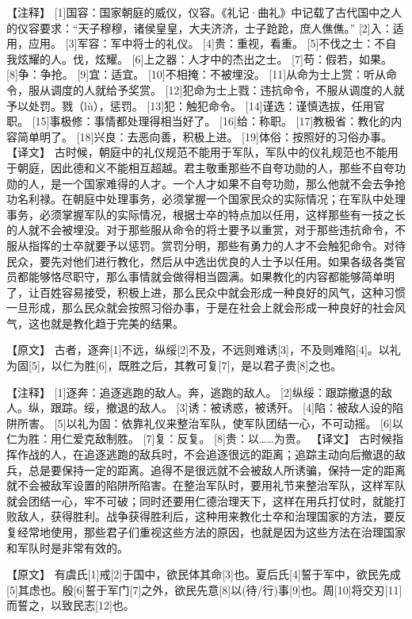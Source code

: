 \documentclass[a4paper,12pt,UTF8,twoside]{ctexbook}
\begin{document}
【注释】
[1]国容：国家朝庭的威仪，仪容。《礼记·曲礼》中记载了古代国中之人的仪容要求：“天子穆穆，诸侯皇皇，大夫济济，士子跄跄，庶人僬僬。”
[2]入：适用，应用。
[3]军容：军中将士的礼仪。
[4]贵：重视，看重。
[5]不伐之士：不自我炫耀的人。伐，炫耀。
[6]上之器：人才中的杰出之士。
[7]苟：假若，如果。
[8]争：争抢。
[9]宜：适宜。
[10]不相掩：不被埋没。
[11]从命为士上赏：听从命令，服从调度的人就给予奖赏。
[12]犯命为士上戮：违抗命令，不服从调度的人就予以处罚。戮（lù），惩罚。
[13]犯：触犯命令。
[14]谨选：谨慎选拔，任用官职。
[15]事极修：事情都处理得相当好了。
[16]给：称职。
[17]教极省：教化的内容简单明了。
[18]兴良：去恶向善，积极上进。
[19]体俗：按照好的习俗办事。
【译文】
古时候，朝庭中的礼仪规范不能用于军队，军队中的仪礼规范也不能用于朝庭，因此德和义不能相互超越。君主敬重那些不自夸功勋的人，那些不自夸功勋的人，是一个国家难得的人才。一个人才如果不自夸功勋，那么他就不会去争抢功名利禄。在朝庭中处理事务，必须掌握一个国家民众的实际情况；在军队中处理事务，必须掌握军队的实际情况，根据士卒的特点加以任用，这样那些有一技之长的人就不会被埋没。对于那些服从命令的将士要予以重赏，对于那些违抗命令，不服从指挥的士卒就要予以惩罚。赏罚分明，那些有勇力的人才不会触犯命令。对待民众，要先对他们进行教化，然后从中选出优良的人士予以任用。如果各级各类官员都能够恪尽职守，那么事情就会做得相当圆满。如果教化的内容都能够简单明了，让百姓容易接受，积极上进，那么民众中就会形成一种良好的风气，这种习惯一旦形成，那么民众就会按照习俗办事，于是在社会上就会形成一种良好的社会风气，这也就是教化趋于完美的结果。

【原文】
古者，逐奔[1]不远，纵绥[2]不及，不远则难诱[3]，不及则难陷[4]。以礼为固[5]，以仁为胜[6]，既胜之后，其教可复[7]，是以君子贵[8]之也。




【注释】
[1]逐奔：追逐逃跑的敌人。奔，逃跑的敌人。
[2]纵绥：跟踪撤退的敌人。纵，跟踪。绥，撤退的敌人。
[3]诱：被诱惑，被诱歼。
[4]陷：被敌人设的陷阱所害。
[5]以礼为固：依靠礼仪来整治军队，使军队团结一心，不可动摇。
[6]以仁为胜：用仁爱克敌制胜。
[7]复：反复。
[8]贵：以……为贵。
【译文】
古时候指挥作战的人，在追逐逃跑的敌兵时，不会追逐很远的距离；追踪主动向后撤退的敌兵，总是要保持一定的距离。追得不是很远就不会被敌人所诱骗，保持一定的距离就不会被敌军设置的陷阱所陷害。在整治军队时，要用礼节来整治军队，这样军队就会团结一心，牢不可破；同时还要用仁德治理天下，这样在用兵打仗时，就能打败敌人，获得胜利。战争获得胜利后，这种用来教化士卒和治理国家的方法，要反复经常地使用，那些君子们重视这些方法的原因，也就是因为这些方法在治理国家和军队时是非常有效的。

【原文】
有虞氏[1]戒[2]于国中，欲民体其命[3]也。夏后氏[4]誓于军中，欲民先成[5]其虑也。殷[6]誓于军门[7]之外，欲民先意[8]以(待/行)事[9]也。周[10]将交刃[11]而誓之，以致民志[12]也。
\end{document}
